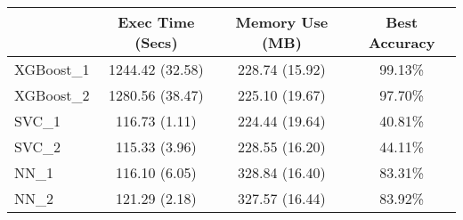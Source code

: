 
\begin{tabular}{|l|c|c|c|} 
\hline
 & \textbf{Exec Time (Secs)} & \textbf{Memory Use (MB)} & \textbf{Best Accuracy}\\
\hline
\hline
XGBoost\_1 & 1244.42 (32.58) & 228.74 (15.92) & 99.13\% \\
\hline
XGBoost\_2 & 1280.56 (38.47) & 225.10 (19.67) & 97.70\% \\
\hline
SVC\_1 & 116.73 (1.11) & 224.44 (19.64) & 40.81\% \\
\hline
SVC\_2 & 115.33 (3.96) & 228.55 (16.20) & 44.11\% \\
\hline
NN\_1 & 116.10 (6.05) & 328.84 (16.40) & 83.31\% \\
\hline
NN\_2 & 121.29 (2.18) & 327.57 (16.44) & 83.92\% \\
\hline

\end{tabular}
